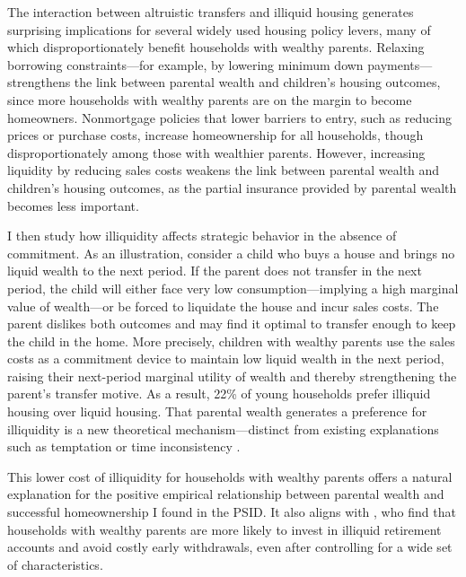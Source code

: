 \documentclass[12pt]{article}
\begin{document}
The interaction between altruistic transfers and illiquid housing generates surprising implications for several widely used housing policy levers, many of which disproportionately benefit households with wealthy parents. Relaxing borrowing constraints---for example, by lowering minimum down payments---strengthens the link between parental wealth and children's housing outcomes, since more households with wealthy parents are on the margin to become homeowners. Nonmortgage policies that lower barriers to entry, such as reducing prices or purchase costs, increase homeownership for all households, though disproportionately among those with wealthier parents. However, increasing liquidity by reducing sales costs weakens the link between parental wealth and children's housing outcomes, as the partial insurance provided by parental wealth becomes less important.

I then study how illiquidity affects strategic behavior in the absence of commitment. As an illustration, consider a child who buys a house and brings no liquid wealth to the next period. If the parent does not transfer in the next period, the child will either face very low consumption—implying a high marginal value of wealth—or be forced to liquidate the house and incur sales costs. The parent dislikes both outcomes and may find it optimal to transfer enough to keep the child in the home. More precisely, children with wealthy parents use the sales costs as a commitment device to maintain low liquid wealth in the next period, raising their next-period marginal utility of wealth and thereby strengthening the parent’s transfer motive. As a result, 22\% of young households prefer illiquid housing over liquid housing. That parental wealth generates a preference for illiquidity is a new theoretical mechanism---distinct from existing explanations such as temptation or time inconsistency \citep[e.g.,][]{attanasio2024temptation,laibson1997golden}.

This lower cost of illiquidity for households with wealthy parents offers a natural explanation for the positive empirical relationship between parental wealth and successful homeownership I found in the PSID. It also aligns with \citet{choukhmane2023benefits}, who find that households with wealthy parents are more likely to invest in illiquid retirement accounts and avoid costly early withdrawals, even after controlling for a wide set of characteristics.
\end{document}
